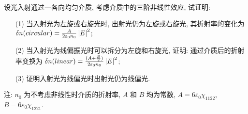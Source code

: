 \documentclass{assignment}
\begin{document}
\begin{prob}
    设光入射通过一各向均匀介质, 考虑介质中的三阶非线性效应, 试证明:
    \begin{itemize}
        \item[(1)] 当入射光为左旋或右旋光时, 出射光仍为左旋或右旋光, 其折射率的变化为 $\delta n(circular)=\frac{A}{2\varepsilon_0n_0}\left\lvert E\right\rvert^2$;
        \item[(2)] 当入射光为线偏振光时可以拆分为左旋和右旋光, 证明: 通过介质后的折射率变换为 $\delta n(linear)=\frac{(A+\frac{B}{2})}{2\varepsilon_0n_0}\left\lvert E\right\rvert^2$;
        \item[(3)] 证明入射光为线偏光时出射光仍为线偏光.
    \end{itemize}
    注: $n_0$ 为不考虑非线性时介质的折射率, $A$ 和 $B$ 均为常数, $A=6\varepsilon_0\chi_{1122}$, $B=6\varepsilon_0\chi_{1221}$.
\end{prob}
\end{document}
